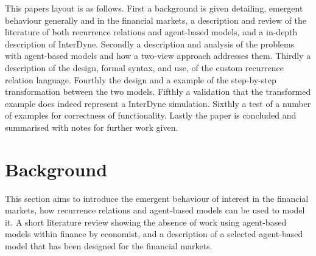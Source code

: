 \documentclass{article}
\begin{document}
This papers layout is as follows. First a background is given detailing, emergent behaviour generally and in the financial markets, a description and review of the literature of both recurrence relations and agent-based models, and a in-depth description of InterDyne. Secondly a description and analysis of the problems with agent-based models and how a two-view approach addresses them. Thirdly a description of the design, formal syntax, and use, of the custom recurrence relation language. Fourthly the design and a example of the step-by-step transformation between the two models. Fifthly a validation that the transformed example does indeed represent a InterDyne simulation. Sixthly a test of a number of examples for correctness of functionality. Lastly the paper is concluded and summarised with notes for further work given.     

























\section{Background}
This section aims to introduce the emergent behaviour of interest in the financial markets, how recurrence relations and agent-based models can be used to model it. A short literature review showing the absence of work using agent-based models within finance by economist, and a description of a selected agent-based model that has been designed for the financial markets. 
\end{document}
